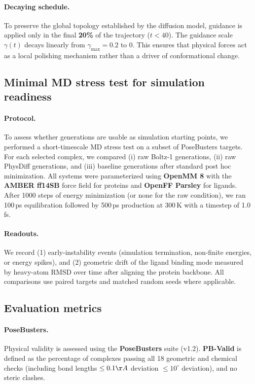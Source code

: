 \documentclass[twocolumn,10pt]{article}
\newcommand{\modelname}{PhysDiff}
\newcommand{\OpenBaseline}{Boltz-1}
\begin{document}
\paragraph{Decaying schedule.}
To preserve the global topology established by the diffusion model, guidance is applied only in the final \textbf{20\%} of the trajectory ($t < 40$). The guidance scale $\gamma(t)$ decays linearly from $\gamma_{\max}=0.2$ to 0. This ensures that physical forces act as a local polishing mechanism rather than a driver of conformational change.

\subsection{Minimal MD stress test for simulation readiness}\label{sec:md_methods}
\paragraph{Protocol.}
To assess whether generations are usable as simulation starting points, we performed a short-timescale MD stress test on a subset of PoseBusters targets.
For each selected complex, we compared (i) raw \OpenBaseline{} generations, (ii) raw \modelname{} generations, and (iii) baseline generations after standard post hoc minimization.
All systems were parameterized using \textbf{OpenMM 8} \cite{eastman2017openmm,openmm2024} with the \textbf{AMBER ff14SB} \cite{maier2015ff14sb} force field for proteins and \textbf{OpenFF Parsley} \cite{openff2022} for ligands.
After 1000 steps of energy minimization (or none for the raw condition), we ran 100\,ps equilibration followed by 500\,ps production at 300\,K with a timestep of 1.0\,fs.
\paragraph{Readouts.}
We record (1) early-instability events (simulation termination, non-finite energies, or energy spikes), and (2) geometric drift of the ligand binding mode measured by heavy-atom RMSD over time after aligning the protein backbone.
All comparisons use paired targets and matched random seeds where applicable.

\subsection{Evaluation metrics}

\paragraph{PoseBusters.}
Physical validity is assessed using the \textbf{PoseBusters} suite (v1.2). \textbf{PB-Valid} is defined as the percentage of complexes passing all 18 geometric and chemical checks (including bond lengths $\le 0.1\AA{}$ deviation $\le 10^\circ$ deviation), and no steric clashes.
\end{document}
